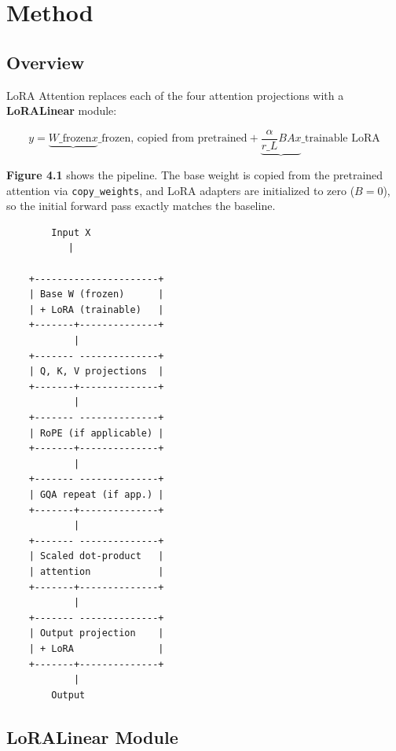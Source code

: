 \section{Method}

\subsection{Overview}

LoRA Attention replaces each of the four attention projections with a 
\textbf{LoRALinear} module:

\[
y = \underbrace{W\_\text{frozen} x}\_{\text{frozen, copied from pretrained}} + 
    \underbrace{\frac{\alpha}{r\_L} B A x}\_{\text{trainable LoRA}}
\tag{4.1}
\]

\textbf{Figure 4.1} shows the pipeline. The base weight is copied from the 
pretrained attention via \texttt{copy\_weights}, and LoRA adapters are initialized 
to zero ($B = 0$), so the initial forward pass exactly matches the baseline.

\begin{lstlisting}
        Input X
           |
            
    +----------------------+
    | Base W (frozen)      |
    | + LoRA (trainable)   |
    +-------+--------------+
            |
    +------- --------------+
    | Q, K, V projections  |
    +-------+--------------+
            |
    +------- --------------+
    | RoPE (if applicable) |
    +-------+--------------+
            |
    +------- --------------+
    | GQA repeat (if app.) |
    +-------+--------------+
            |
    +------- --------------+
    | Scaled dot-product   |
    | attention            |
    +-------+--------------+
            |
    +------- --------------+
    | Output projection    |
    | + LoRA               |
    +-------+--------------+
            |
        Output
\end{lstlisting}

\subsection{LoRALinear Module}

